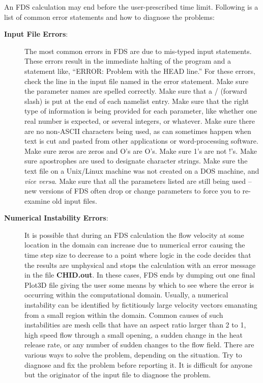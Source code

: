 \documentclass[11pt]{book}
\begin{document}
An FDS calculation may end before the user-prescribed time limit.
Following is a list of common error statements and how to diagnose the problems:
\begin{description}
\item[{\bf Input File Errors}:] The most common errors in FDS are due to mis-typed input statements.
These errors result in the immediate halting of the program and a statement like, ``ERROR: Problem
with the HEAD line.'' For these errors, check the line in the input file named in the error statement.
Make sure the parameter names are spelled correctly. Make sure that a / (forward slash)
is put at the end of each namelist entry. Make sure that the right type of information is
being provided for each parameter, like whether one real number is expected, or several integers, or
whatever. Make sure there are no non-ASCII characters being used, as can sometimes happen when text is
cut and pasted from other applications or word-processing software. Make sure zeros are zeros and
O's are O's. Make sure 1's are not !'s. Make sure apostrophes are used to designate character strings.
Make sure the text file on a Unix/Linux machine was not created on a DOS machine, and {\em vice versa}.
Make sure that all the parameters listed are still being used -- new versions of FDS often drop or
change parameters to force you to re-examine old input files.

\item [{\bf Numerical Instability Errors}:] It is possible that during an FDS calculation the flow
velocity at some location in the domain can increase due to numerical error causing the time step
size to decrease to a point where logic in the code decides that the results are unphysical
and stops the calculation with an error message in the file {\bf CHID.out}.
In these cases, FDS ends by dumping out one final
Plot3D file giving the user some means by which to see where the
error is occurring within the computational domain. Usually, a numerical
instability can be identified by fictitiously large velocity vectors emanating from
a small region within the domain. Common causes of such instabilities are
mesh cells that have an aspect ratio larger than 2 to 1, high speed flow through a small
opening, a sudden change in the heat release rate, or any number of sudden changes to the
flow field. There are various ways to solve the problem, depending on the situation.
Try to diagnose and fix the problem before reporting it. It is difficult
for anyone but the originator of the input file to diagnose the problem.


\end{description}
\end{document}
